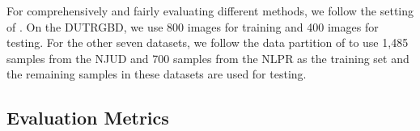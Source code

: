 \documentclass[runningheads]{llncs}
\begin{document}
For comprehensively and fairly evaluating different methods, we follow the setting of \cite{DUTRGBD}. On the DUTRGBD, we use 800 images for training and 400 images for testing. For the other seven datasets, we follow the data partition of \cite{PCANet,MMCI,CTMF,DUTRGBD} to use 1,485 samples from the NJUD and 700 samples from the NLPR as the training set and the remaining samples in these datasets are used for testing.

\subsection{Evaluation Metrics}

\begin{table}[t]
 \centering
 \caption{Results ($\uparrow$: $F_{max}$, $F_{ada}$~\cite{Fmeasure}, $F_{\beta}^{\omega}$~\cite{wFmeasure}, $S_{m}$~\cite{Smeasure} and $E_{m}$~\cite{Emeasure}; $\downarrow$: MAE~\cite{MAE}) of different RGB-D SOD methods across eight datasets. The best results are highlight in \textcolor{red}{\textbf{red}}. $\natural$: Traditional methods. $\dagger$: VGG-16~\cite{VGG} as backbone. $\ddagger$: VGG-19~\cite{VGG} as backbone. $\sharp$: ResNet-50~\cite{Resnet} as backbone. -: No data available.}
 \label{tab:compmodels}
\end{table}
\end{document}
